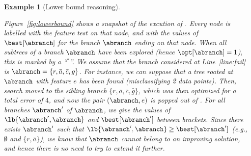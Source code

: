 \documentclass{article}
\newtheorem{example}{Example}
\begin{document}
\begin{example}[Lower bound reasoning]
	\label{ex:lb}


	Figure~\ref{fig:lowerbound} shows a snapshot of the excution of \blossom. Every node is labelled with the feature test on that node, and with the values of $\best[\abranch]$ for the branch $\abranch$ ending on that node. When all subtrees of a branch $\abranch$ have been explored (hence $\opt[\abranch]=1$), this is marked by a ``$^*$''. We assume that the branch considered at Line~\ref{line:fail} is $\abranch = \{r, \bar{a}, \bar{c}, g\}$. For instance, we can suppose that a tree rooted at $\abranch$ with feature $e$ has been found (misclassifying 2 data points). Then, search moved to the sibling branch $\{r, \bar{a}, \bar{c}, \bar{g}\}$, which was then optimized for a total error of $4$, and now the pair $(\abranch,e)$ is popped out of \sequence. For all branches $\abranch'$ of $\abranch$, we give the values of $\lb{\abranch',\abranch}$ and $\best[\abranch']$ between brackets. Since there exists $\abranch'$ such that $\lb{\abranch',\abranch} \geq \best[\abranch']$ (e.g., $\emptyset$ and $\{r, \bar{a}\}$), we know that $\abranch$ cannot belong to an improving solution, and hence there is no need to try to extend it further.




\end{example}
\end{document}
